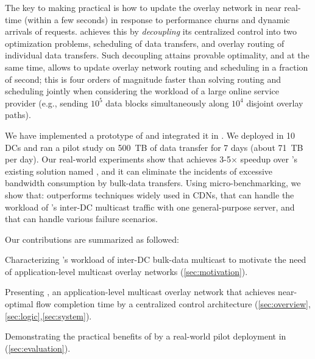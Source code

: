 The key to making \name practical is how to update the overlay
network in near real-time (within a few seconds) in response to
performance churns and dynamic arrivals of requests. \name achieves
this by {\em decoupling} its centralized control into two
optimization problems, scheduling of data transfers, and overlay
routing of individual data transfers. Such decoupling attains
provable optimality, and at the same time, allows \name to update
overlay network routing and scheduling in a fraction of second; this is four
orders of magnitude faster than solving routing and scheduling jointly
when considering the workload of a large online service provider (e.g., sending
$10^5$ data blocks simultaneously along $10^4$ disjoint
overlay paths).


We have implemented a prototype of \name and integrated it in
\company. We deployed
\name in 10 DCs and ran a pilot study on 500~TB of data transfer
for 7 days (about 71~TB per day).
Our real-world experiments show that \name achieves 3-5$\times$
speedup over \company's existing solution named \alg, and it can eliminate the
incidents of excessive bandwidth consumption by bulk-data transfers.
Using micro-benchmarking, we show
that: \name outperforms techniques widely used in CDNs, that \name
can handle the workload of \company's inter-DC multicast traffic with
one general-purpose server, and that \name can handle various
failure scenarios.


Our contributions are summarized as followed:
\begin{packeditemize}
\item Characterizing \company's workload of inter-DC bulk-data
multicast to motivate the need of application-level multicast
overlay networks (\Section\ref{sec:motivation}).
\item Presenting \name, an application-level multicast overlay
network that achieves near-optimal flow completion time by a
centralized control architecture
(\Section\ref{sec:overview},\ref{sec:logic},\ref{sec:system}).
\item Demonstrating the practical benefits of \name {} by a real-world
pilot deployment in \company (\Section\ref{sec:evaluation}).
\end{packeditemize}
